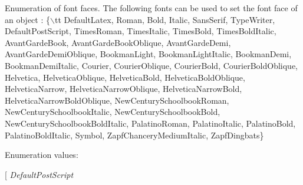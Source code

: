 Enumeration of font faces. The following fonts can be used to set the font face of an object : \{$\backslash$tt Default\-Latex, Roman, Bold, Italic, Sans\-Serif, Type\-Writer, Default\-Post\-Script, Times\-Roman, Times\-Italic, Times\-Bold, Times\-Bold\-Italic, Avant\-Garde\-Book, Avant\-Garde\-Book\-Oblique, Avant\-Garde\-Demi, Avant\-Garde\-Demi\-Oblique, Bookman\-Light, Bookman\-Light\-Italic, Bookman\-Demi, Bookman\-Demi\-Italic, Courier, Courier\-Oblique, Courier\-Bold, Courier\-Bold\-Oblique, Helvetica, Helvetica\-Oblique, Helvetica\-Bold, Helvetica\-Bold\-Oblique, Helvetica\-Narrow, Helvetica\-Narrow\-Oblique, Helvetica\-Narrow\-Bold, Helvetica\-Narrow\-Bold\-Oblique, New\-Century\-Schoolbook\-Roman, New\-Century\-Schoolbook\-Italic, New\-Century\-Schoolbook\-Bold, New\-Century\-Schoolbook\-Bold\-Italic, Palatino\-Roman, Palatino\-Italic, Palatino\-Bold, Palatino\-Bold\-Italic, Symbol, Zapf\-Chancery\-Medium\-Italic, Zapf\-Dingbats\} \begin{Desc}
\item[Enumeration values: ]\par
\begin{description}
\item[{\em 
{\em Default\-Latex}\label{classAttributes_s76s17}
}]\item[{\em 
{\em Roman}\label{classAttributes_s76s18}
}]\item[{\em 
{\em Bold}\label{classAttributes_s76s19}
}]\item[{\em 
{\em Italic}\label{classAttributes_s76s20}
}]\item[{\em 
{\em Sans\-Serif}\label{classAttributes_s76s21}
}]\item[{\em 
{\em Type\-Writer}\label{classAttributes_s76s22}
}]\item[{\em 
{\em Default\-Post\-Script}\label{classAttributes_s76s23}
}
\end{description}
\end{Desc}
